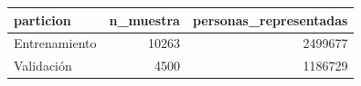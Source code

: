 \begin{tabular}{lrr}
\toprule
particion & n\_muestra & personas\_representadas \\
\midrule
Entrenamiento & 10263 & 2499677 \\
Validación & 4500 & 1186729 \\
\bottomrule
\end{tabular}
